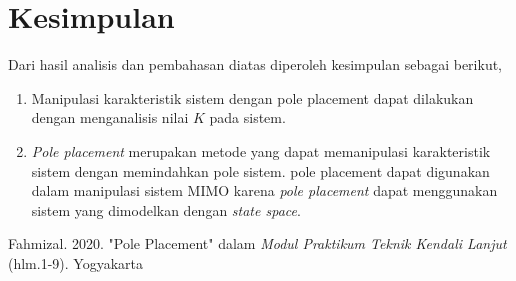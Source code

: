\documentclass[../main.tex]{subfiles}
\begin{document}
    \section{Kesimpulan}
        Dari hasil analisis dan pembahasan diatas diperoleh kesimpulan sebagai berikut,
        \begin{enumerate}
            \item Manipulasi karakteristik sistem dengan pole placement dapat dilakukan dengan menganalisis nilai $K$ pada sistem.
            \item \textit{Pole placement} merupakan metode yang dapat memanipulasi karakteristik sistem dengan memindahkan pole sistem. pole placement dapat digunakan dalam manipulasi sistem MIMO karena \textit{pole placement} dapat menggunakan sistem yang dimodelkan dengan \textit{state space}.
        \end{enumerate}
    \begin{thebibliography}{1}
         Fahmizal. 2020. "Pole Placement" dalam \textit{Modul Praktikum Teknik Kendali Lanjut} (hlm.1-9). Yogyakarta
    \end{thebibliography}
\end{document}
